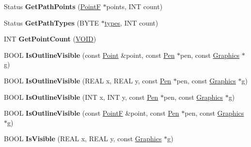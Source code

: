 \begin{DoxyCompactItemize}
\item 
\mbox{\label{class_graphics_path_a1b4b835939dcbef9b452a2b0f47b10ef}} 
Status {\bfseries Get\+Path\+Points} (\hyperlink{struct_point_f}{PointF} $\ast$points, I\+NT count)
\item 
\mbox{\label{class_graphics_path_a53f88ebf2d14001ee26b9428e23aec1f}} 
Status {\bfseries Get\+Path\+Types} (B\+Y\+TE $\ast$\hyperlink{structtypes}{types}, I\+NT count)
\item 
\mbox{\label{class_graphics_path_a1f1ba03fea16604f95e7e2a733400a11}} 
I\+NT {\bfseries Get\+Point\+Count} (\hyperlink{interfacevoid}{V\+O\+ID})
\item 
\mbox{\label{class_graphics_path_a312cdc1ad0908ba1d49efc09db7d1294}} 
B\+O\+OL {\bfseries Is\+Outline\+Visible} (const \hyperlink{struct_point}{Point} \&point, const \hyperlink{class_pen}{Pen} $\ast$pen, const \hyperlink{class_graphics}{Graphics} $\ast$g)
\item 
\mbox{\label{class_graphics_path_a0a15a619869397c3617e6659243adad9}} 
B\+O\+OL {\bfseries Is\+Outline\+Visible} (R\+E\+AL x, R\+E\+AL y, const \hyperlink{class_pen}{Pen} $\ast$pen, const \hyperlink{class_graphics}{Graphics} $\ast$g)
\item 
\mbox{\label{class_graphics_path_a91995d27d6d0837461cb79c59702a268}} 
B\+O\+OL {\bfseries Is\+Outline\+Visible} (I\+NT x, I\+NT y, const \hyperlink{class_pen}{Pen} $\ast$pen, const \hyperlink{class_graphics}{Graphics} $\ast$g)
\item 
\mbox{\label{class_graphics_path_ae5a6435e356976f16091ee903b082925}} 
B\+O\+OL {\bfseries Is\+Outline\+Visible} (const \hyperlink{struct_point_f}{PointF} \&point, const \hyperlink{class_pen}{Pen} $\ast$pen, const \hyperlink{class_graphics}{Graphics} $\ast$g)
\item 
\mbox{\label{class_graphics_path_a1aa6724dd48f7e004661a46e75ddca9b}} 
B\+O\+OL {\bfseries Is\+Visible} (R\+E\+AL x, R\+E\+AL y, const \hyperlink{class_graphics}{Graphics} $\ast$g)
\item 
\mbox{\label{class_graphics_path_a4176ea8f03412973275e6cd3436a306c}} 

\end{DoxyCompactItemize}

